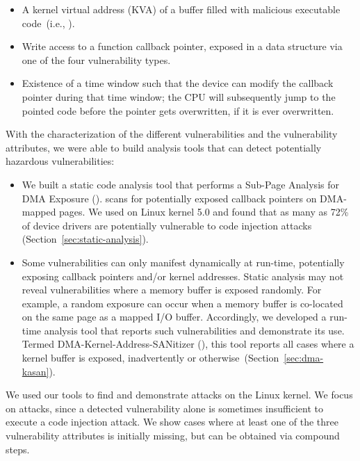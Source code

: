 \begin{itemize}
    \item A kernel virtual address (KVA) of a buffer filled with malicious executable code~(i.e., \mabaf).
    \item Write access to a function callback pointer, exposed in a data structure via one of the four \subpage vulnerability types. 
    \item Existence of a time window such that the device can modify the callback pointer during that time window; the CPU will subsequently jump to the pointed code before the pointer gets overwritten, if it is ever overwritten. 
\end{itemize} 

With the characterization of the different \subpage{} vulnerabilities and the vulnerability attributes, we were able to build analysis tools that can detect potentially hazardous \subpage{} vulnerabilities:

\begin{itemize}
    \item We built a static code analysis tool that performs a Sub-Page Analysis for DMA Exposure (\tool). \tool scans for potentially exposed callback pointers on DMA-mapped pages. We used \tool on Linux kernel 5.0 and found that as many as 72\% of device drivers are potentially vulnerable to code injection attacks (Section~\ref{sec:static-analysis}). 

    \item Some \subpage{} vulnerabilities can only manifest dynamically at run-time, potentially exposing callback pointers and/or kernel addresses. Static analysis may not reveal  vulnerabilities where a memory buffer is exposed randomly. For example, a random exposure can occur when a memory buffer is co-located on the same page as a mapped I/O buffer. Accordingly, we developed a run-time analysis tool that reports such vulnerabilities and demonstrate its use. Termed DMA-Kernel-Address-SANitizer (\dkasan), this tool reports all cases where a kernel buffer is exposed, inadvertently or otherwise~(Section~\ref{sec:dma-kasan}).
\end{itemize}

We used our tools to find and demonstrate attacks on the Linux kernel. We focus on \compound attacks, since a detected \subpage vulnerability alone is sometimes insufficient to execute a code injection attack. We show cases where at least one of the three vulnerability attributes is initially missing, but can be obtained via compound steps. 

